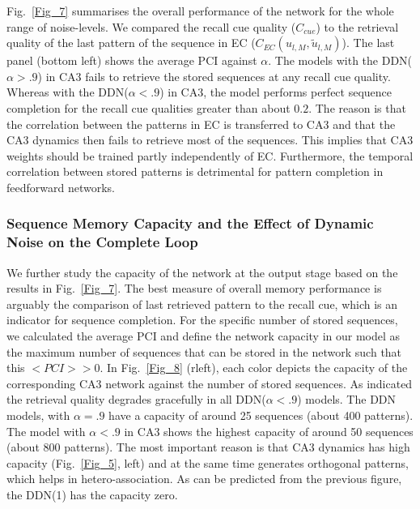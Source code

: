 \documentclass[utf8]{frontiersSCNS} %
\begin{document}
%
Fig.~\ref{Fig_7} summarises the overall performance of the network for the whole range of noise-levels. We compared the recall cue quality ($C_{cue}$) to the retrieval quality of the last pattern of the sequence in EC ($C_{EC} (u_{l,M}, \tilde{u}_{l,M})$).
%
The last panel (bottom left) shows the average PCI against $\alpha$.
%
The models with the DDN($\alpha > .9$) in CA3 fails to retrieve the stored sequences at any recall cue quality. Whereas with the DDN($\alpha < .9$) in CA3, the model performs perfect sequence completion for the recall cue qualities greater than about $0.2$.
%
The reason is that the correlation between the patterns in EC is transferred to CA3 and that the CA3 dynamics then fails to retrieve most of the sequences. This implies that CA3 weights should be trained partly independently of EC. Furthermore, the temporal correlation between stored patterns is detrimental for pattern completion in feedforward networks.

\subsubsection{Sequence Memory Capacity and the Effect of Dynamic Noise on the Complete Loop}

We further study the capacity of the network at the output stage based on the results in Fig.~\ref{Fig_7}. 
The best measure of overall memory performance is arguably the comparison of last retrieved pattern to the recall cue, which is an indicator for sequence completion.
%
For the specific number of stored sequences, we calculated the average PCI and define the network capacity in our model as the maximum number of sequences that can be stored in the network such that this $<PCI> > 0$.
%
In Fig.~\ref{Fig_8} (rleft), each color depicts the capacity of the corresponding CA3 network against the number of stored sequences.
%
As indicated the retrieval quality degrades gracefully in all DDN($\alpha < .9$)  models.
% 
The DDN models, with $\alpha = .9$ have a capacity of around 25 sequences (about 400 patterns).
%
The model with $\alpha < .9$ in CA3 shows the highest capacity of around 50 sequences (about 800 patterns).
%
The most important reason is that CA3 dynamics has high capacity (Fig.~\ref{Fig_5}, left) and at the same time generates orthogonal patterns, which helps in hetero-association.  
%
As can be predicted from the previous figure, the DDN(1) has the capacity zero. 
\end{document}
